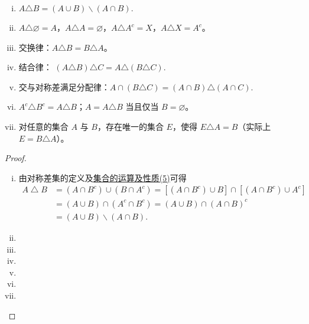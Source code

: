\documentclass[../../main.tex]{subfiles}
\begin{document}
\begin{theorem}[集合对称差的性质]\label{theorem:集合对称差的性质}
\begin{enumerate}[(i)]
\item \(A \triangle B = \left( A\cup B \right) \backslash \left( A\cap B \right) .\)

\item \( A \triangle \varnothing = A \)，\( A \triangle A = \varnothing \)，\( A \triangle A^c = X \)，\( A \triangle X = A^c \)。

\item 交换律：\( A \triangle B = B \triangle A \)。

\item 结合律：
\(
(A \triangle B) \triangle C = A \triangle (B \triangle C).
\)

\item 交与对称差满足分配律：$A \cap (B \triangle C) = (A \cap B) \triangle (A \cap C).$

\item \( A^c \triangle B^c = A \triangle B \)；\( A = A \triangle B \) 当且仅当 \( B = \varnothing \)。

\item 对任意的集合 \( A \) 与 \( B \)，存在唯一的集合 \( E \)，使得 \( E \triangle A = B \)（实际上 \( E = B \triangle A \)）。
\end{enumerate}
\end{theorem}
\begin{proof}
\begin{enumerate}[(i)]
\item 由对称差集的定义及\hyperref[theorem:集合的运算及性质]{集合的运算及性质(5)}可得
\begin{align*}
A\bigtriangleup B&=\left( A\cap B^c \right) \cup \left( B\cap A^c \right) =\left[ \left( A\cap B^c \right) \cup B \right] \cap \left[ \left( A\cap B^c \right) \cup A^c \right] 
\\
&=\left( A\cup B \right) \cap \left( A^c\cap B^c \right) =\left( A\cup B \right) \cap \left( A\cap B \right) ^c
\\
&=\left( A\cup B \right) \backslash \left( A\cap B \right) .
\end{align*}

\item 

\item 

\item 

\item 

\item 

\item 
\end{enumerate}
\end{proof}
\end{document}
